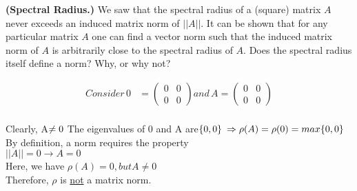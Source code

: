 \textbf{(Spectral Radius.)} We saw that the spectral radius of a
(square) matrix $A$ never exceeds an induced matrix norm of $||A||$.
It can be shown that for any particular matrix $A$ one can find a
vector norm such that the induced matrix norm of $A$ is arbitrarily
close to the spectral radius of $A$. Does the spectral radius itself
define a norm? Why, or why not?



{\color{blue}
\begin{align}
Consider\,  0&=\begin{pmatrix}
0 & 0\\ 
0 & 0
\end{pmatrix}
and\, A=
\begin{pmatrix}
0 & 0\\ 
0 & 0
\end{pmatrix}\\
\end{align}

Clearly, A$\neq0\\$
The eigenvalues of 0 and A are$ \{0,0\}\\$
$\Rightarrow \rho(A)=\rho(0)=max \{0,0\}\\$
By definition, a norm requires the property\\
$||A|| =0 \to A=0$\\
Here, we have $\rho(A)=0, but A\neq 0$\\
Therefore, $\rho$ is \underline{not} a matrix norm.

}
